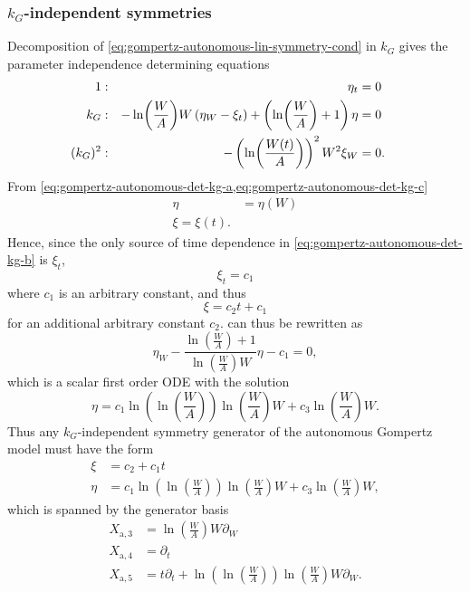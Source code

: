 \subsubsection{\texorpdfstring{\(k_G\)-independent symmetries}{Growth rate-independent symmetries}}

Decomposition of \cref{eq:gompertz-autonomous-lin-symmetry-cond} in \(k_G\) gives the parameter independence determining equations
\begin{subequations}
  \begin{flalign}
    1 & : & \eta_t &= 0 && \FlLabel{eq:gompertz-autonomous-det-kg-a}\\
    k_G & : & -\ln(\frac{W}{A}) W\left(\eta_W - \xi_t\right) + \left(\ln(\frac{W}{A}) + 1\right) \eta &= 0 && \FlLabel{eq:gompertz-autonomous-det-kg-b}\\
    (k_G)^2 & : & -\left(\ln(\frac{W(t)}{A})\right)^2 W^2 \xi_W &= 0. && \FlLabel{eq:gompertz-autonomous-det-kg-c}
  \end{flalign}
\end{subequations}
From \cref{eq:gompertz-autonomous-det-kg-a,eq:gompertz-autonomous-det-kg-c}
\begin{align}
  \eta &= \eta(W) \\
  \xi = \xi(t).
\end{align}
Hence, since the only source of time dependence in \cref{eq:gompertz-autonomous-det-kg-b} is \(\xi_t\),
\begin{equation}
  \xi_t = c_1
\end{equation}
where \(c_1\) is an arbitrary constant, and thus
\begin{equation}
  \xi = c_2 t + c_1
\end{equation}
for an additional arbitrary constant \(c_2\).
 can thus be rewritten as
\begin{equation}
  \eta_W - \frac{\ln(\frac{W}{A}) + 1}{\ln(\frac{W}{A}) W} \eta - c_1 = 0,
\end{equation}
which is a scalar first order ODE with the solution
\begin{equation}
  \eta = c_1 \ln(\ln(\frac{W}{A})) \ln(\frac{W}{A}) W + c_3 \ln(\frac{W}{A}) W.
\end{equation}
Thus any \(k_G\)-independent symmetry generator of the autonomous Gompertz model  must have the form
\begin{align}
  \xi &= c_2 + c_1 t \\
  \eta &= c_1 \ln(\ln(\frac{W}{A})) \ln(\frac{W}{A}) W + c_3 \ln(\frac{W}{A}) W,
\end{align}
which is spanned by the generator basis
\begin{align}
  X_{\text{a},3} &= \ln(\frac{W}{A}) W \partial_W \\
  X_{\text{a},4} &= \partial_t \\
  X_{\text{a},5} &= t \partial_t + \ln(\ln(\frac{W}{A})) \ln(\frac{W}{A}) W \partial_W.
\end{align}


